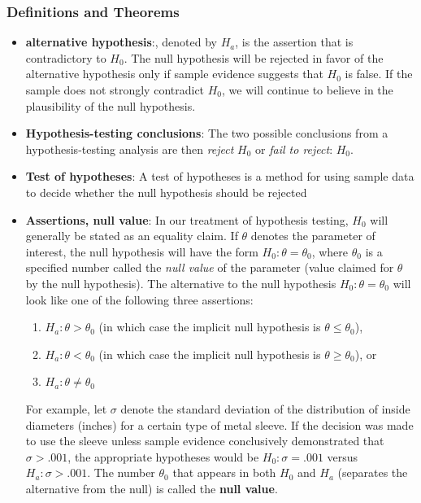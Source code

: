 \documentclass{report}
\begin{document}
    \subsubsection{Definitions and Theorems}
    \begin{itemize}
        \item \textbf{alternative hypothesis}:, denoted by \( H_a \), is the assertion that is contradictory to \( H_0 \).
            \bigbreak \noindent 
            The null hypothesis will be rejected in favor of the alternative hypothesis only if sample evidence suggests that \( H_0 \) is false. If the sample does not strongly contradict \( H_0 \), we will continue to believe in the plausibility of the null hypothesis. 
    \item \textbf{Hypothesis-testing conclusions}: The two possible conclusions from a hypothesis-testing analysis are then \textit{reject} \( H_0 \) or \textit{fail to reject}: \( H_0 \).
    \item \textbf{Test of hypotheses}: 
        A test of hypotheses is a method for using sample data to decide whether the null hypothesis should be rejected
    \item \textbf{Assertions, null value}:
    In our treatment of hypothesis testing, \( H_0 \) will generally be stated as an equality claim. If \( \theta \) denotes the parameter of interest, the null hypothesis will have the form \( H_0: \theta = \theta_0 \), where \( \theta_0 \) is a specified number called the \textit{null value} of the parameter (value claimed for \( \theta \) by the null hypothesis). 
    \bigbreak \noindent 
    The alternative to the null hypothesis \( H_0: \theta = \theta_0 \) will look like one of the following three assertions:
    \begin{enumerate}
        \item \( H_a: \theta > \theta_0 \) (in which case the implicit null hypothesis is \( \theta \leq \theta_0 \)),
        \item \( H_a: \theta < \theta_0 \) (in which case the implicit null hypothesis is \( \theta \geq \theta_0 \)), or
        \item \( H_a: \theta \neq \theta_0 \)
    \end{enumerate}
    For example, let \( \sigma \) denote the standard deviation of the distribution of inside diameters (inches) for a certain type of metal sleeve. If the decision was made to use the sleeve unless sample evidence conclusively demonstrated that \( \sigma > .001 \), the appropriate hypotheses would be \( H_0: \sigma = .001 \) versus \( H_a: \sigma > .001 \). The number \( \theta_0 \) that appears in both \( H_0 \) and \( H_a \) (separates the alternative from the null) is called the \textbf{null value}.

\end{itemize}
\end{document}
